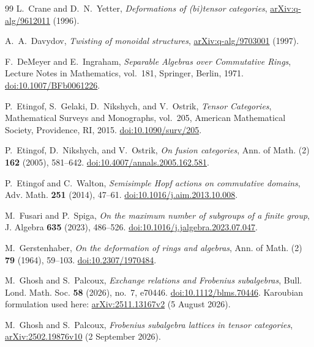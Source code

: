 \documentclass[11pt]{amsart}
\theoremstyle{definition}
\theoremstyle{remark}
\begin{document}
\begin{thebibliography}{99}
L.~Crane and D.~N.~Yetter,
\emph{Deformations of (bi)tensor categories},
\href{https://arxiv.org/abs/q-alg/9612011}{arXiv:q-alg/9612011} (1996).

A.~A.~Davydov,
\emph{Twisting of monoidal structures},
\href{https://arxiv.org/abs/q-alg/9703001}{arXiv:q-alg/9703001} (1997).

F.~DeMeyer and E.~Ingraham,
\emph{Separable Algebras over Commutative Rings},
Lecture Notes in Mathematics, vol.~181, Springer, Berlin, 1971.
\href{https://doi.org/10.1007/BFb0061226}
{doi:10.1007/BFb0061226}.

P.~Etingof, S.~Gelaki, D.~Nikshych, and V.~Ostrik,
\emph{Tensor Categories},
Mathematical Surveys and Monographs, vol.~205,
American Mathematical Society, Providence, RI, 2015.
\href{https://doi.org/10.1090/surv/205}{doi:10.1090/surv/205}.

P.~Etingof, D.~Nikshych, and V.~Ostrik,
\emph{On fusion categories},
Ann. of Math. (2) \textbf{162} (2005), 581--642.
\href{https://doi.org/10.4007/annals.2005.162.581}
{doi:10.4007/annals.2005.162.581}.

P.~Etingof and C.~Walton,
\emph{Semisimple Hopf actions on commutative domains},
Adv. Math. \textbf{251} (2014), 47--61.
\href{https://doi.org/10.1016/j.aim.2013.10.008}
{doi:10.1016/j.aim.2013.10.008}.

M.~Fusari and P.~Spiga,
\emph{On the maximum number of subgroups of a finite group},
J. Algebra \textbf{635} (2023), 486--526.
\href{https://doi.org/10.1016/j.jalgebra.2023.07.047}
{doi:10.1016/j.jalgebra.2023.07.047}.

M.~Gerstenhaber,
\emph{On the deformation of rings and algebras},
Ann. of Math. (2) \textbf{79} (1964), 59--103.
\href{https://doi.org/10.2307/1970484}{doi:10.2307/1970484}.

M.~Ghosh and S.~Palcoux,
\emph{Exchange relations and Frobenius subalgebras},
Bull. Lond. Math. Soc. \textbf{58} (2026), no.~7, e70446.
\href{https://doi.org/10.1112/blms.70446}{doi:10.1112/blms.70446}.
Karoubian formulation used here:
\href{https://arxiv.org/abs/2511.13167v2}{arXiv:2511.13167v2}
(5 August 2026).

M.~Ghosh and S.~Palcoux,
\emph{Frobenius subalgebra lattices in tensor categories},
\href{https://arxiv.org/abs/2502.19876v10}{arXiv:2502.19876v10}
(2 September 2026).


\end{thebibliography}
\end{document}
